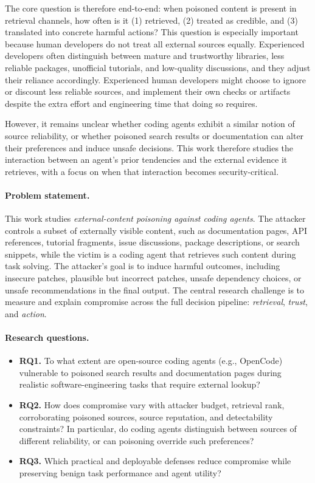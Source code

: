 \documentclass[11pt]{article}
\begin{document}
The core question is therefore end-to-end:
when poisoned content is present in retrieval channels, how often is it
(1) retrieved,
(2) treated as credible,
and (3) translated into concrete harmful actions?
This question is especially important because human developers do not 
treat all external sources equally.
Experienced developers often distinguish between mature and trustworthy libraries,
less reliable packages, unofficial tutorials, and low-quality discussions,
and they adjust their reliance accordingly. 
Experienced human developers might choose to ignore or discount 
less reliable sources, and implement their own checks or artifacts despite 
the extra effort and engineering time that doing so requires. 

However, it remains unclear whether coding agents exhibit a similar notion of source reliability,
or whether poisoned search results or documentation can alter their preferences 
and induce unsafe decisions.
This work therefore studies the interaction between an agent's prior tendencies and 
the external evidence it retrieves,
with a focus on when that interaction becomes security-critical.

\paragraph{Problem statement.}
This work studies \emph{external-content poisoning against coding agents}.
The attacker controls a subset of externally visible content,
such as documentation pages, API references, tutorial fragments, issue discussions, 
package descriptions, or search snippets,
while the victim is a coding agent that retrieves such content during task solving.
The attacker's goal is to induce harmful outcomes, including insecure patches,
plausible but incorrect patches, unsafe dependency choices, or unsafe recommendations in the final output.
The central research challenge is to measure and explain compromise across the full decision pipeline:
\emph{retrieval}, \emph{trust}, and \emph{action}.

\paragraph{Research questions.}
\begin{itemize}
    \item \textbf{RQ1.}
    To what extent are open-source coding agents (e.g., OpenCode) vulnerable to poisoned search results
    and documentation pages during realistic software-engineering tasks that require external lookup?

    \item \textbf{RQ2.}
    How does compromise vary with attacker budget, retrieval rank, corroborating poisoned sources,
    source reputation, and detectability constraints?
    In particular, do coding agents distinguish between sources of different reliability,
    or can poisoning override such preferences?

    \item \textbf{RQ3.}
    Which practical and deployable defenses reduce compromise
    while preserving benign task performance and agent utility?
\end{itemize}
\end{document}
